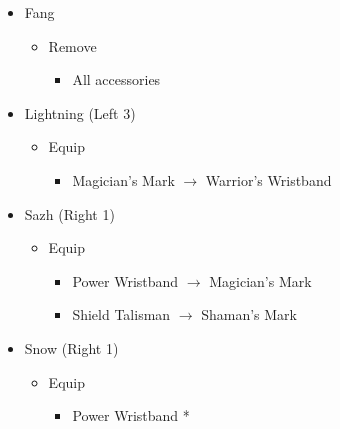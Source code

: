\begin{menu}
\begin{itemize}
\begin{itemize}
\begin{itemize}
\begin{itemize}
            \end{itemize}
        \end{itemize}
    \end{itemize}
    \equip
    \begin{itemize}
        \item Fang
        \begin{itemize}
            \item Remove
            \begin{itemize}
                \item All accessories
            \end{itemize}
        \end{itemize}
        \item Lightning (Left 3)
        \begin{itemize}
            \item Equip
            \begin{itemize}
                \item Magician's Mark $\rightarrow$ Warrior's Wristband
            \end{itemize}
        \end{itemize}
        \item Sazh (Right 1)
        \begin{itemize}
            \item Equip
            \begin{itemize}
                \item Power Wristband $\rightarrow$ Magician's Mark
                \item Shield Talisman $\rightarrow$ Shaman's Mark
            \end{itemize}
        \end{itemize}
        \item Snow (Right 1)
        \begin{itemize}
            \item Equip
            \begin{itemize}
                \item Power Wristband *
            \end{itemize}
        \end{itemize}
    \end{itemize}
\end{itemize}
\end{menu}

\renewcommand{\first}{[1] Strike Team (\com/\syn/\com)}
\renewcommand{\second}{[2] Tri-Disaster (\rav/\rav/\rav)}
\renewcommand{\third}{[3] Strategic Warfare (\com/\syn/\sen)}
\renewcommand{\fourth}{[4] Tri-Disaster (\rav/\rav/\rav)}
\renewcommand{\fifth}{[5] Cerberus (\com/\com/\com)}
\renewcommand{\sixth}{[6] Cerberus (\com/\com/\com)}

